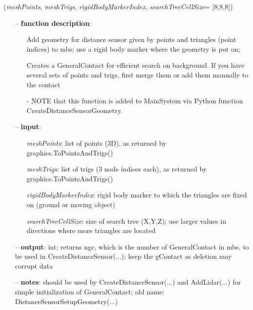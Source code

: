 %
\begin{flushleft}
\label{sec:mainsystemextensions:CreateDistanceSensorGeometry}
({\it meshPoints}, {\it meshTrigs}, {\it rigidBodyMarkerIndex}, {\it searchTreeCellSize}= [8,8,8])
\end{flushleft}
\setlength{\itemindent}{0.7cm}
\begin{itemize}[leftmargin=0.7cm]
\item[--]
{\bf function description}: \vspace{-6pt}
\begin{itemize}[leftmargin=1.2cm]
\setlength{\itemindent}{-0.7cm}
\item[]Add geometry for distance sensor given by points and triangles (point indices) to mbs; use a rigid body marker where the geometry is put on;
\item[]Creates a GeneralContact for efficient search on background. If you have several sets of points and trigs, first merge them or add them manually to the contact
\item[]- NOTE that this function is added to MainSystem via Python function CreateDistanceSensorGeometry.
\end{itemize}
\item[--]
{\bf input}: \vspace{-6pt}
\begin{itemize}[leftmargin=1.2cm]
\setlength{\itemindent}{-0.7cm}
\item[]{\it meshPoints}: list of points (3D), as returned by graphics.ToPointsAndTrigs()
\item[]{\it meshTrigs}: list of trigs (3 node indices each), as returned by graphics.ToPointsAndTrigs()
\item[]{\it rigidBodyMarkerIndex}: rigid body marker to which the triangles are fixed on (ground or moving object)
\item[]{\it searchTreeCellSize}: size of search tree (X,Y,Z); use larger values in directions where more triangles are located
\end{itemize}
\item[--]
{\bf output}: int; returns ngc, which is the number of GeneralContact in mbs, to be used in CreateDistanceSensor(...); keep the gContact as deletion may corrupt data
\item[--]
{\bf notes}: should be used by CreateDistanceSensor(...) and AddLidar(...) for simple initialization of GeneralContact; old name: DistanceSensorSetupGeometry(...)
\vspace{12pt}\end{itemize}
%

